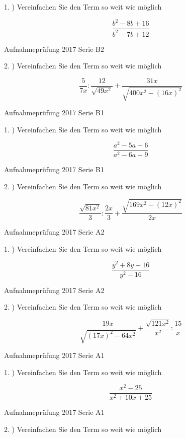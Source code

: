 {1. ) Vereinfachen Sie den Term so weit wie möglich

$$\frac{b^2-8b+16}{b^2-7b+12}$$

Aufnahmeprüfung 2017 Serie B2

2. ) Vereinfachen Sie den Term so weit wie möglich

$$\frac{5}{7x} : \frac{12}{\sqrt{49x^2}} + \frac{31x}{\sqrt{400x^2 - (16x)^2}}$$

Aufnahmeprüfung 2017 Serie B1

1. ) Vereinfachen Sie den Term so weit wie möglich

$$\frac{a^2-5a+6}{a^2-6a+9}$$

Aufnahmeprüfung 2017 Serie B1

2. ) Vereinfachen Sie den Term so weit wie möglich

$$\frac{\sqrt{81x^2}}{3} : \frac{2x}3 + \frac{\sqrt{169x^2 - (12x)^2}}{2x}$$

Aufnahmeprüfung 2017 Serie A2

1. ) Vereinfachen Sie den Term so weit wie möglich

$$\frac{y^2+8y+16}{y^2-16}$$

Aufnahmeprüfung 2017 Serie A2

2. ) Vereinfachen Sie den Term so weit wie möglich

$$\frac{19x}{\sqrt{(17x)^2 - 64x^2}} + \frac{\sqrt{121x^2}}{x^2} : \frac{15}{x}$$

Aufnahmeprüfung 2017 Serie A1

1. ) Vereinfachen Sie den Term so weit wie möglich

$$\frac{x^2-25}{x^2+10x+25}$$

Aufnahmeprüfung 2017 Serie A1

2. ) Vereinfachen Sie den Term so weit wie möglich

}
